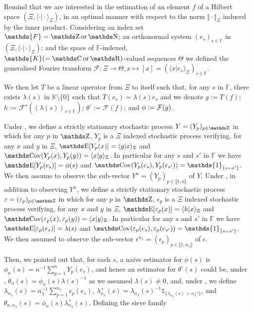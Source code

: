\documentclass[a4paper,11pt]{book}
\begin{document}
Remind that we are interested in the estimation of an element $f$ of a Hilbert space $(\Xi, \langle \cdot \vert \cdot \rangle_{\Xi})$, in an optimal manner with respect to the norm $\Vert \cdot \Vert_{\Xi}$ induced by the inner product.
Considering an index set $\mathds{F} = \Z \text{or} \N$; an orthonormal system $(e_{s})_{s \in \mathds{F}}$ in $(\Xi, \langle \cdot \vert \cdot \rangle_{\Xi})$; and the space of $\mathds{F}$-indexed, $\mathds{K}(= \C \text{or} \R)$-valued sequences $\Theta$ we defined the generalised Fourier transform $\mathcal{F}: \Xi \to \Theta, x \mapsto [x] = (\langle x \vert e_{s} \rangle_{\Xi})_{s \in \mathds{F}}$.

We then let $T$ be a linear operator from $\Xi$ to itself such that, for any $s$ in $\mathds{F}$, there exists $\lambda(s)$ in $\mathds{K} \setminus \{0\}$ such that $T(e_{s}) = \lambda(s) e_{s}$ and we denote $g := T(f)$; $h := \mathcal{F}^{\star}((\lambda(s))_{s \in \mathds{F}})$; $\theta^{\circ} := \mathcal{F}(f)$; and $\phi := \operatorname{\mathcal{F}}(g)$.

Under , we define a strictly stationary stochastic process $Y = (Y_{p})_{p \in \Z}$ in which for any $p$ in $\Z$, $Y_{p}$ is a $\Xi$ indexed stochastic process verifying, for any $x$ and $y$ in $\Xi$, $\E[Y_{p}(x)] = \langle g \vert x \rangle_{\Xi}$ and $\Cov(Y_{p}(x), Y_{p}(y)) = \langle x \vert y \rangle_{\Xi}$.
In particular for any $s$ and $s'$ in $\mathds{F}$ we have $\E[Y_{p}(e_{s})] = \phi(s)$ and $\Cov(Y_{p}(e_{s}), Y_{p}(e_{s'})) = \mathds{1}_{\{s = s'\}}$.
We then assume to observe the sub-vector $Y^{n} = (Y_{p})_{p \in \llbracket 1, n \rrbracket}$ of $Y$.
Under , in addition to observing $Y^{n}$, we define  a strictly stationary stochastic process $\epsilon = (\epsilon_{p})_{p \in \Z}$ in which for any $p$ in $\Z$, $\epsilon_{p}$ is a $\Xi$ indexed stochastic process verifying, for any $x$ and $y$ in $\Xi$, $\E[\epsilon_{p}(x)] = \langle h \vert x \rangle_{\Xi}$ and $\Cov(\epsilon_{p}(x), \epsilon_{p}(y)) = \langle x \vert y \rangle_{\Xi}$.
In particular for any $s$ and $s'$ in $\mathds{F}$ we have $\E[\epsilon_{p}(e_{s})] = \lambda(s)$ and $\Cov(\epsilon_{p}(e_{s}), \epsilon_{p}(e_{s'})) = \mathds{1}_{\{s = s'\}}$.
We then assumed to observe the sub-vector $\epsilon^{n_{\lambda}} = (\epsilon_{p})_{p \in \llbracket 1, n_{\lambda} \rrbracket}$ of $\epsilon$.

Then, we pointed out that, for each $s$, a naive estimator for $\phi(s)$ is $\phi_{n}(s) = n^{-1} \sum\nolimits_{p = 1}^{n} Y_{p}(e_{s})$, and hence an estimator for $\theta^{\circ}(s)$ could be, under , $\theta_{n}(s) = \phi_{n}(s) \lambda(s)^{-1}$ as we assumed $\lambda(s) \neq 0$, and, under , we define $\lambda_{n_{\lambda}}(s) = n_{\lambda}^{-1} \sum\nolimits_{p = 1}^{n_{\lambda}} \epsilon_{p}(e_{s})$, $\lambda_{n_{\lambda}}^{+}(s) = \lambda_{n_{\lambda}}(s)^{-1} \mathds{1}_{\{\lambda_{n_{\lambda}}(s) > n_{\lambda}^{-1}\}}$, and $\theta_{n, n_{\lambda}}(s) = \phi_{n}(s) \lambda_{n_{\lambda}}^{+}(s)$.
Defining the sieve family
\end{document}
